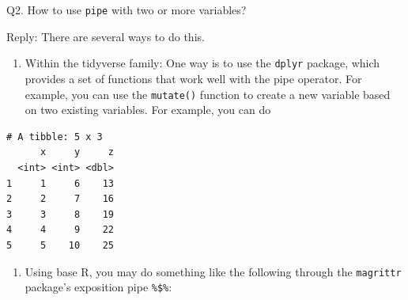 \documentclass[
  letterpaper,
  DIV=11,
  numbers=noendperiod]{scrreprt}
\newenvironment{Shaded}{\begin{snugshade}}{\end{snugshade}}
\newcommand{\AttributeTok}[1]{\textcolor[rgb]{0.40,0.45,0.13}{#1}}
\newcommand{\CommentTok}[1]{\textcolor[rgb]{0.37,0.37,0.37}{#1}}
\newcommand{\ControlFlowTok}[1]{\textcolor[rgb]{0.00,0.23,0.31}{\textbf{#1}}}
\newcommand{\DecValTok}[1]{\textcolor[rgb]{0.68,0.00,0.00}{#1}}
\newcommand{\FunctionTok}[1]{\textcolor[rgb]{0.28,0.35,0.67}{#1}}
\newcommand{\NormalTok}[1]{\textcolor[rgb]{0.00,0.23,0.31}{#1}}
\newcommand{\OtherTok}[1]{\textcolor[rgb]{0.00,0.23,0.31}{#1}}
\newcommand{\SpecialCharTok}[1]{\textcolor[rgb]{0.37,0.37,0.37}{#1}}
\providecommand{\tightlist}{%
  \setlength{\itemsep}{0pt}\setlength{\parskip}{0pt}}
\begin{document}
Q2. How to use \texttt{pipe} with two or more variables?

Reply: There are several ways to do this.

\begin{enumerate}
\def\labelenumi{\arabic{enumi}.}
\tightlist
\item
  Within the tidyverse family: One way is to use the \texttt{dplyr}
  package, which provides a set of functions that work well with the
  pipe operator. For example, you can use the \texttt{mutate()} function
  to create a new variable based on two existing variables. For example,
  you can do
\end{enumerate}

\begin{Shaded}
\end{Shaded}

\begin{verbatim}
# A tibble: 5 x 3
      x     y     z
  <int> <int> <dbl>
1     1     6    13
2     2     7    16
3     3     8    19
4     4     9    22
5     5    10    25
\end{verbatim}

\begin{enumerate}
\def\labelenumi{\arabic{enumi}.}
\setcounter{enumi}{1}
\tightlist
\item
  Using base R, you may do something like the following through the
  \texttt{magrittr} package's exposition pipe \texttt{\%\$\%}:
\end{enumerate}

\begin{Shaded}
\end{Shaded}
\end{document}
